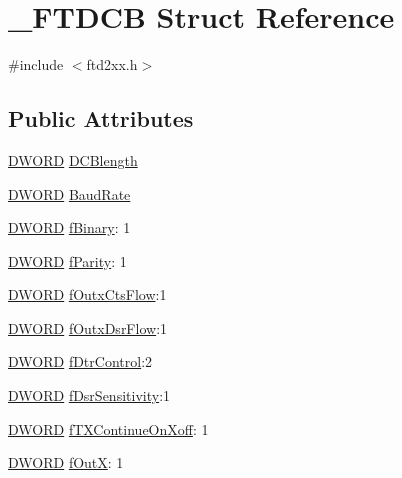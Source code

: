 \hypertarget{struct__FTDCB}{
\section{\_\-FTDCB Struct Reference}
\label{struct__FTDCB}
}


{\ttfamily \#include $<$ftd2xx.h$>$}\subsection*{Public Attributes}
\begin{DoxyCompactItemize}
\item 
\hyperlink{LALUsbx64_2include_2WinTypes_8h_ad342ac907eb044443153a22f964bf0af}{DWORD} \hyperlink{struct__FTDCB_a0d577b6cc351abc8313fd7eeaf7a4468}{DCBlength}
\item 
\hyperlink{LALUsbx64_2include_2WinTypes_8h_ad342ac907eb044443153a22f964bf0af}{DWORD} \hyperlink{struct__FTDCB_a3c59a8bdbb30e28505045b3186c89cbf}{BaudRate}
\item 
\hyperlink{LALUsbx64_2include_2WinTypes_8h_ad342ac907eb044443153a22f964bf0af}{DWORD} \hyperlink{struct__FTDCB_a66a920f15680e8bc01bc4b9d7e1e442a}{fBinary}: 1
\item 
\hyperlink{LALUsbx64_2include_2WinTypes_8h_ad342ac907eb044443153a22f964bf0af}{DWORD} \hyperlink{struct__FTDCB_a8a81323a9b1ba34bd0cc2ae97d898c73}{fParity}: 1
\item 
\hyperlink{LALUsbx64_2include_2WinTypes_8h_ad342ac907eb044443153a22f964bf0af}{DWORD} \hyperlink{struct__FTDCB_a3e5166713d0405820849e27ba554ba7d}{fOutxCtsFlow}:1
\item 
\hyperlink{LALUsbx64_2include_2WinTypes_8h_ad342ac907eb044443153a22f964bf0af}{DWORD} \hyperlink{struct__FTDCB_af5ce76c2d358a419e028f8879aca3dcb}{fOutxDsrFlow}:1
\item 
\hyperlink{LALUsbx64_2include_2WinTypes_8h_ad342ac907eb044443153a22f964bf0af}{DWORD} \hyperlink{struct__FTDCB_a770cbe04afe4551d954b460e15bc253e}{fDtrControl}:2
\item 
\hyperlink{LALUsbx64_2include_2WinTypes_8h_ad342ac907eb044443153a22f964bf0af}{DWORD} \hyperlink{struct__FTDCB_a18de82101e19a3c2be9226489e7df0b2}{fDsrSensitivity}:1
\item 
\hyperlink{LALUsbx64_2include_2WinTypes_8h_ad342ac907eb044443153a22f964bf0af}{DWORD} \hyperlink{struct__FTDCB_afa27d3f28cd9154df261cd643df33497}{fTXContinueOnXoff}: 1
\item 
\hyperlink{LALUsbx64_2include_2WinTypes_8h_ad342ac907eb044443153a22f964bf0af}{DWORD} \hyperlink{struct__FTDCB_ad69a6d309c4e2f95588179e818a87c9d}{fOutX}: 1

\end{DoxyCompactItemize}
